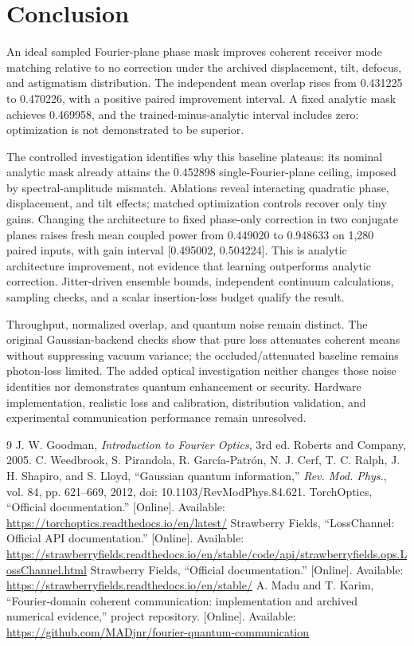 \documentclass[journal]{IEEEtran}
\begin{document}
\section{Conclusion}
An ideal sampled Fourier-plane phase mask improves coherent receiver mode matching relative to no correction under the archived displacement, tilt, defocus, and astigmatism distribution. The independent mean overlap rises from 0.431225 to 0.470226, with a positive paired improvement interval. A fixed analytic mask achieves 0.469958, and the trained-minus-analytic interval includes zero: optimization is not demonstrated to be superior.

The controlled investigation identifies why this baseline plateaus: its nominal analytic mask already attains the 0.452898 single-Fourier-plane ceiling, imposed by spectral-amplitude mismatch. Ablations reveal interacting quadratic phase, displacement, and tilt effects; matched optimization controls recover only tiny gains. Changing the architecture to fixed phase-only correction in two conjugate planes raises fresh mean coupled power from 0.449020 to 0.948633 on 1,280 paired inputs, with gain interval [0.495002, 0.504224]. This is analytic architecture improvement, not evidence that learning outperforms analytic correction. Jitter-driven ensemble bounds, independent continuum calculations, sampling checks, and a scalar insertion-loss budget qualify the result.

Throughput, normalized overlap, and quantum noise remain distinct. The original Gaussian-backend checks show that pure loss attenuates coherent means without suppressing vacuum variance; the occluded/attenuated baseline remains photon-loss limited. The added optical investigation neither changes those noise identities nor demonstrates quantum enhancement or security. Hardware implementation, realistic loss and calibration, distribution validation, and experimental communication performance remain unresolved.

\begin{thebibliography}{9}
J. W. Goodman, \emph{Introduction to Fourier Optics}, 3rd ed. Roberts and Company, 2005.
C. Weedbrook, S. Pirandola, R. Garc\'{i}a-Patr\'{o}n, N. J. Cerf, T. C. Ralph, J. H. Shapiro, and S. Lloyd, ``Gaussian quantum information,'' \emph{Rev. Mod. Phys.}, vol. 84, pp. 621--669, 2012, doi: 10.1103/RevModPhys.84.621.
TorchOptics, ``Official documentation.'' [Online]. Available: \url{https://torchoptics.readthedocs.io/en/latest/}
Strawberry Fields, ``LossChannel: Official API documentation.'' [Online]. Available: \url{https://strawberryfields.readthedocs.io/en/stable/code/api/strawberryfields.ops.LossChannel.html}
Strawberry Fields, ``Official documentation.'' [Online]. Available: \url{https://strawberryfields.readthedocs.io/en/stable/}
A. Madu and T. Karim, ``Fourier-domain coherent communication: implementation and archived numerical evidence,'' project repository. [Online]. Available: \url{https://github.com/MADjnr/fourier-quantum-communication}
\end{thebibliography}
\end{document}
